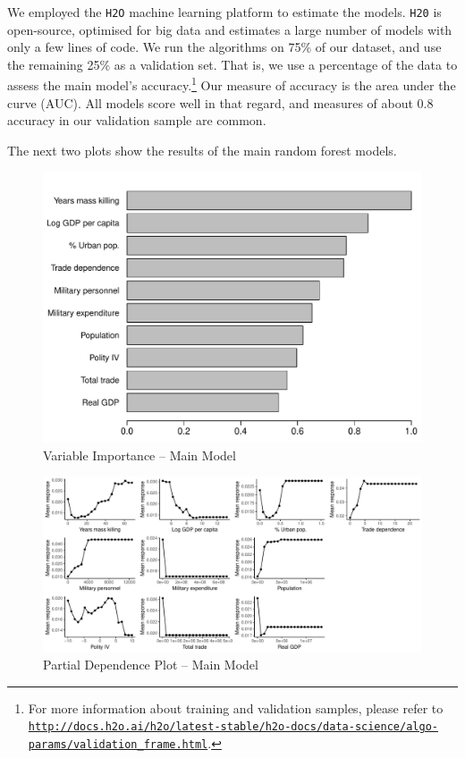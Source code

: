 \documentclass[a4paper,12pt]{article}
\begin{document}
We employed the \texttt{H2O} machine learning platform \citep{h2o2017} to estimate the models. \texttt{H20} is open-source, optimised for big data and estimates a large number of models with only a few lines of code. We run the algorithms on 75\% of our dataset, and use the remaining 25\% as a validation set. That is, we use a percentage of the data to assess the main model's accuracy.\footnote{For more information about training and validation samples, please refer to \href{http://docs.h2o.ai/h2o/latest-stable/h2o-docs/data-science/algo-params/validation_frame.html}{\texttt{http://docs.h2o.ai/h2o/latest-stable/h2o-docs/data-science/algo-params/validation\_frame.html}}.} Our measure of accuracy is the area under the curve (AUC). All models score well in that regard, and measures of about 0.8 accuracy in our validation sample are common.

The next two plots show the results of the main random forest models. 

\begin{figure}[H]
    \centering
    \includegraphics{images/rf-mk.pdf}
    \caption{Variable Importance -- Main Model}
    \label{fig:rf-mk}
\end{figure}

\newpage 

\begin{figure}[H]
    \centering
    \includegraphics[width=.98\textheight,angle=90]{images/rf-mk-pd.pdf}
    \caption{Partial Dependence Plot -- Main Model}
    \label{fig:rf-mk-pd}
\end{figure}
\end{document}
